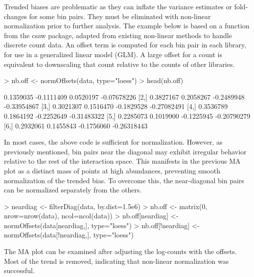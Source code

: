 \documentclass[12pt]{report}
\renewenvironment{Schunk}{\vspace{0pt}}{\vspace{0pt}}
\newcommand{\csaw}{csaw}
\begin{document}
Trended biases are problematic as they can inflate the variance estimates or fold-changes for some bin pairs. 
They must be eliminated with non-linear normalization prior to further analysis.
The example below is based on a function from the \csaw{} package, adapted from existing non-linear methods to handle discrete count data. %
An offset term is computed for each bin pair in each library, for use in a generalized linear model (GLM). 
A large offset for a count is equivalent to downscaling that count relative to the counts of other libraries. 

\begin{Schunk}
\begin{Sinput}
> nb.off <- normOffsets(data, type="loess")
> head(nb.off)
\end{Sinput}
\begin{Soutput}
          [,1]       [,2]       [,3]        [,4]
[1,] 0.1359035 -0.1111409  0.0520197 -0.07678226
[2,] 0.3827167  0.2058267 -0.2489948 -0.33954867
[3,] 0.3021307  0.1516470 -0.1829528 -0.27082491
[4,] 0.3536789  0.1864192 -0.2252649 -0.31483322
[5,] 0.2285073  0.1019900 -0.1225945 -0.20790279
[6,] 0.2932061  0.1455843 -0.1756060 -0.26318443
\end{Soutput}
\end{Schunk}

In most cases, the above code is sufficient for normalization.
However, as previously mentioned, bin pairs near the diagonal may exhibit irregular behavior relative to the rest of the interaction space.
This manifests in the previous MA plot as a distinct mass of points at high abundances, preventing smooth normalization of the trended bias.
To overcome this, the near-diagonal bin pairs can be normalized separately from the others.

\begin{Schunk}
\begin{Sinput}
> neardiag <- filterDiag(data, by.dist=1.5e6)
> nb.off <- matrix(0, nrow=nrow(data), ncol=ncol(data))
> nb.off[neardiag] <- normOffsets(data[neardiag,], type="loess")
> nb.off[!neardiag] <- normOffsets(data[!neardiag,], type="loess")
\end{Sinput}
\end{Schunk}

The MA plot can be examined after adjusting the log-counts with the offsets.
Most of the trend is removed, indicating that non-linear normalization was successful.


\begin{Schunk}
\end{Schunk}
\end{document}
